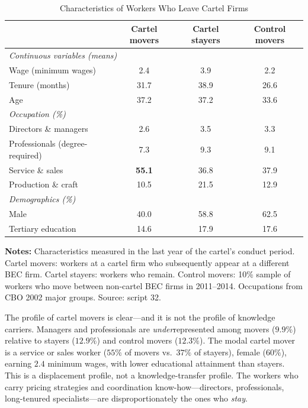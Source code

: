 \begin{table}[htbp]
\centering
\caption{Characteristics of Workers Who Leave Cartel Firms}\label{tab:worker_chars}
\begin{tabular}{lccc}
\toprule
& Cartel movers & Cartel stayers & Control movers \\
\midrule
\multicolumn{4}{l}{\emph{Continuous variables (means)}} \\[3pt]
Wage (minimum wages) & 2.4 & 3.9 & 2.2 \\
Tenure (months) & 31.7 & 38.9 & 26.6 \\
Age & 37.2 & 37.2 & 33.6 \\[6pt]
\multicolumn{4}{l}{\emph{Occupation (\%)}} \\[3pt]
Directors \& managers & 2.6 & 3.5 & 3.3 \\
Professionals (degree-required) & 7.3 & 9.3 & 9.1 \\
Service \& sales & \textbf{55.1} & 36.8 & 37.9 \\
Production \& craft & 10.5 & 21.5 & 12.9 \\[6pt]
\multicolumn{4}{l}{\emph{Demographics (\%)}} \\[3pt]
Male & 40.0 & 58.8 & 62.5 \\
Tertiary education & 14.6 & 17.9 & 17.6 \\
\bottomrule
\end{tabular}
\vspace{0.5em}
\begin{minipage}{0.90\textwidth}
\scriptsize{\textbf{Notes:} Characteristics measured in the last year of the cartel's conduct period. Cartel movers: workers at a cartel firm who subsequently appear at a different BEC firm. Cartel stayers: workers who remain. Control movers: 10\% sample of workers who move between non-cartel BEC firms in 2011--2014. Occupations from CBO 2002 major groups. Source: script 32.\par}
\end{minipage}
\end{table}

The profile of cartel movers is clear---and it is not the profile of knowledge carriers. Managers and professionals are \emph{under}represented among movers ($9.9\%$) relative to stayers ($12.9\%$) and control movers ($12.3\%$). The modal cartel mover is a service or sales worker ($55\%$ of movers vs.\ $37\%$ of stayers), female ($60\%$), earning $2.4$ minimum wages, with lower educational attainment than stayers. This is a displacement profile, not a knowledge-transfer profile. The workers who carry pricing strategies and coordination know-how---directors, professionals, long-tenured specialists---are disproportionately the ones who \emph{stay}.

